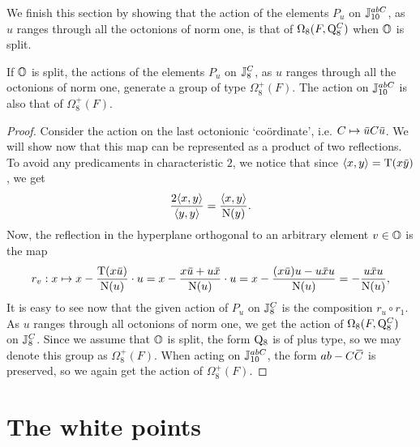 We finish this section by showing that the action of the elements $P_u$ on $\mathbb{J}_{10}^{abC}$, 
as $u$ ranges
through all the octonions of norm one, is that of $\Omega_8(F,\mathord{\mathrm{Q}}_8^C)$ when $\mathbb{O}$ is split.

\begin{lemma}
	\label{lemma:1_spin8plus}
	If $\mathbb{O}$ is split, the actions of the elements $P_u$ on 
	$\mathbb{J}_8^C$, as $u$ ranges through	all the octonions of norm one, 
	generate a group of type 
	$\Omega_8^+(F)$. The action on $\mathbb{J}_{10}^{abC}$ is also that 
	of $\Omega_8^+(F)$.
\end{lemma}

\begin{proof}
Consider the action on the last octonionic `co\"{o}rdinate', i.e.
$C \mapsto \ovu   C \ovu  $. We will show now that this map can be represented as a
product of two reflections. To avoid any predicaments in characteristic $2$, we notice that
since $\langle x,y \rangle = \operatorname{T}(x\mathord{\mbox{\hspace*{0pt}}\,\overline{\!y\!\!\;}\!\:}\mbox{\hspace*{0pt}} )$, we get
\begin{equation}
\frac{2 \langle x, y \rangle}{\langle y,y \rangle} =
\frac{\langle x, y \rangle}{\mathord{\mathrm{N}}(y)}.
\end{equation}
Now, the reflection in the hyperplane orthogonal to an arbitrary element $v\in \mathbb{O}$ is the map
\begin{equation}
    r_v : x \mapsto     x - \frac{\Tr(x \ovu  )}{\NN(u)} \cdot u =
	 x - \frac{ x\ovu  + u\ovx  }{\NN(u)} \cdot u =
    x - \frac{(x\ovu  )u - u\ovx u}{\NN(u)} = - \frac{u\ovx u}{\NN(u)},
\end{equation}
It is easy to see now that the given
action of $P_u$ on $\mathbb{J}_8^C$ is the composition $r_u \circ r_1$. As $u$ ranges through all 
octonions of norm one, we get the action of $\Omega_8(F,\mathord{\mathrm{Q}}_8^C)$ on $\mathbb{J}_8^C$. Since we
assume that $\mathbb{O}$ is split, the form $\mathord{\mathrm{Q}}_8$ is of plus type, so we may denote this
group as $\Omega_8^+(F)$. When acting on $\mathbb{J}_{10}^{abC}$, the form $ab-C\mathord{\mbox{\hspace*{0pt}}\,\overline{\!C\!\!\;}\!\:}\mbox{\hspace*{0pt}}$ is
preserved, so we again get the action of $\Omega_8^+(F)$.
\end{proof}

\section{The white points}
